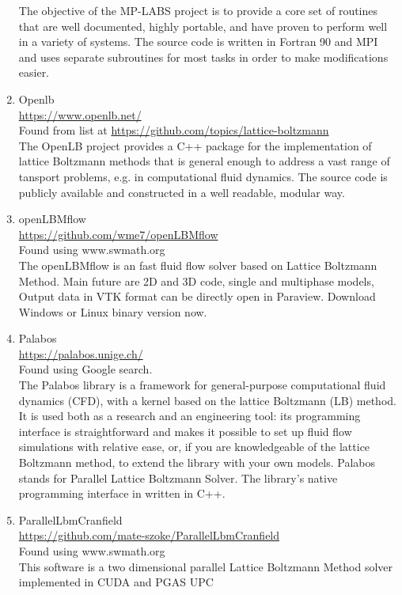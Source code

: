 \documentclass{article}
\begin{document}
\begin{enumerate}
The objective of the MP-LABS project is to provide a core set of routines that are well documented, highly portable, and have proven to perform well in a variety of systems. The source code is written in Fortran 90 and MPI and uses separate subroutines for most tasks in order to make modifications easier.

\item Openlb \\  
\href{https://www.openlb.net/}{https://www.openlb.net/}
\\
Found from list at \href{https://github.com/topics/lattice-boltzmann}{https://github.com/topics/lattice-boltzmann}\\
The OpenLB project provides a C++ package for the implementation of lattice Boltzmann methods that is general enough to address a vast range of tansport problems, e.g. in computational fluid dynamics. The source code is publicly available and constructed in a well readable, modular way. 

\item openLBMflow \\
\href{https://github.com/wme7/openLBMflow}{https://github.com/wme7/openLBMflow}\\
Found using www.swmath.org \\
The openLBMflow is an fast fluid flow solver based on Lattice Boltzmann Method. Main future are 2D and 3D code, single and multiphase models, Output data in VTK format can be directly open in Paraview. Download Windows or Linux binary version now.

\item Palabos \\
\href{https://palabos.unige.ch/}{https://palabos.unige.ch/}
\\
Found using Google search.\\
The Palabos library is a framework for general-purpose computational fluid dynamics (CFD), with a kernel based on the lattice Boltzmann (LB) method. It is used both as a research and an engineering tool: its programming interface is straightforward and makes it possible to set up fluid flow simulations with relative ease, or, if you are knowledgeable of the lattice Boltzmann method, to extend the library with your own models. Palabos stands for Parallel Lattice Boltzmann Solver.
The library’s native programming interface in written in C++. 

\item ParallelLbmCranfield \\
\href{https://github.com/mate-szoke/ParallelLbmCranfield}{https://github.com/mate-szoke/ParallelLbmCranfield}\\
Found using www.swmath.org \\
This software is a two dimensional parallel Lattice Boltzmann Method solver implemented in CUDA and PGAS UPC


\end{enumerate}
\end{document}
